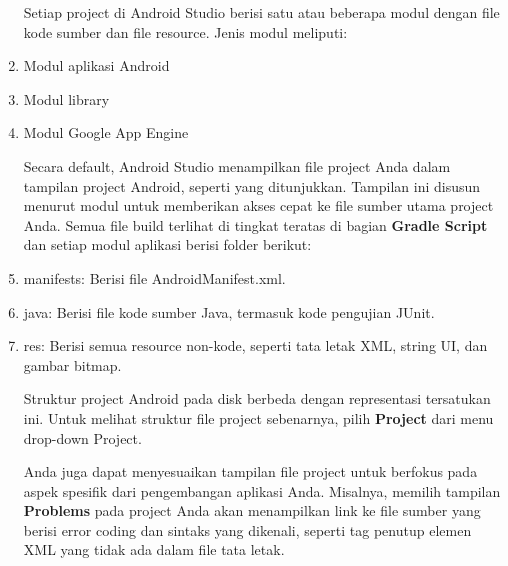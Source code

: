 \begin{enumerate}
Setiap project di Android Studio berisi satu atau beberapa modul dengan file kode sumber dan file resource. Jenis modul meliputi:
\item Modul aplikasi Android
\item Modul library
\item Modul Google App Engine

Secara default, Android Studio menampilkan file project Anda dalam tampilan project Android, seperti yang ditunjukkan. Tampilan ini disusun menurut modul untuk memberikan akses cepat ke file sumber utama project Anda. Semua file build terlihat di tingkat teratas di bagian \textbf{Gradle Script} dan setiap modul aplikasi berisi folder berikut:
\item manifests: Berisi file AndroidManifest.xml.
\item java: Berisi file kode sumber Java, termasuk kode pengujian JUnit.
\item res: Berisi semua resource non-kode, seperti tata letak XML, string UI, dan gambar bitmap.

Struktur project Android pada disk berbeda dengan representasi tersatukan ini. Untuk melihat struktur file project sebenarnya, pilih \textbf{Project} dari menu drop-down Project.

Anda juga dapat menyesuaikan tampilan file project untuk berfokus pada aspek spesifik dari pengembangan aplikasi Anda. Misalnya, memilih tampilan \textbf{Problems} pada project Anda akan menampilkan link ke file sumber yang berisi error coding dan sintaks yang dikenali, seperti tag penutup elemen XML yang tidak ada dalam file tata letak.
\end{enumerate}

